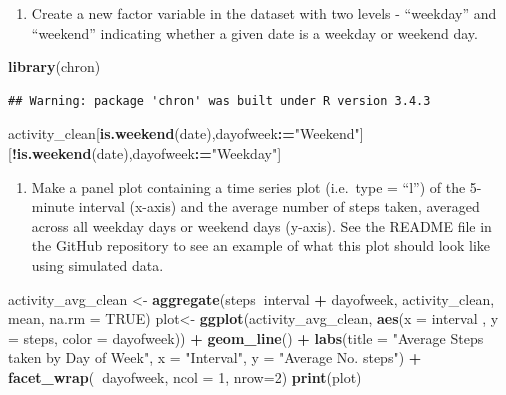 \documentclass[]{article}
\newenvironment{Shaded}{\begin{snugshade}}{\end{snugshade}}
\newcommand{\KeywordTok}[1]{\textcolor[rgb]{0.13,0.29,0.53}{\textbf{#1}}}
\newcommand{\DataTypeTok}[1]{\textcolor[rgb]{0.13,0.29,0.53}{#1}}
\newcommand{\DecValTok}[1]{\textcolor[rgb]{0.00,0.00,0.81}{#1}}
\newcommand{\StringTok}[1]{\textcolor[rgb]{0.31,0.60,0.02}{#1}}
\newcommand{\OtherTok}[1]{\textcolor[rgb]{0.56,0.35,0.01}{#1}}
\newcommand{\OperatorTok}[1]{\textcolor[rgb]{0.81,0.36,0.00}{\textbf{#1}}}
\newcommand{\ErrorTok}[1]{\textcolor[rgb]{0.64,0.00,0.00}{\textbf{#1}}}
\newcommand{\NormalTok}[1]{#1}
\providecommand{\tightlist}{%
  \setlength{\itemsep}{0pt}\setlength{\parskip}{0pt}}
\begin{document}
\begin{enumerate}
\def\labelenumi{\arabic{enumi}.}
\tightlist
\item
  Create a new factor variable in the dataset with two levels -
  ``weekday'' and ``weekend'' indicating whether a given date is a
  weekday or weekend day.
\end{enumerate}

\begin{Shaded}
\begin{Highlighting}[]
\KeywordTok{library}\NormalTok{(chron)}
\end{Highlighting}
\end{Shaded}

\begin{verbatim}
## Warning: package 'chron' was built under R version 3.4.3
\end{verbatim}

\begin{Shaded}
\begin{Highlighting}[]
\NormalTok{activity_clean[}\KeywordTok{is.weekend}\NormalTok{(date),dayofweek}\OperatorTok{:}\ErrorTok{=}\StringTok{"Weekend"}\NormalTok{][}\OperatorTok{!}\KeywordTok{is.weekend}\NormalTok{(date),dayofweek}\OperatorTok{:}\ErrorTok{=}\StringTok{"Weekday"}\NormalTok{]}
\end{Highlighting}
\end{Shaded}

\begin{enumerate}
\def\labelenumi{\arabic{enumi}.}
\setcounter{enumi}{1}
\tightlist
\item
  Make a panel plot containing a time series plot (i.e.~type = ``l'') of
  the 5-minute interval (x-axis) and the average number of steps taken,
  averaged across all weekday days or weekend days (y-axis). See the
  README file in the GitHub repository to see an example of what this
  plot should look like using simulated data.
\end{enumerate}

\begin{Shaded}
\begin{Highlighting}[]
\NormalTok{activity_avg_clean <-}\StringTok{ }\KeywordTok{aggregate}\NormalTok{(steps}\OperatorTok{~}\NormalTok{interval }\OperatorTok{+}\StringTok{ }\NormalTok{dayofweek, activity_clean, mean, }\DataTypeTok{na.rm =} \OtherTok{TRUE}\NormalTok{)}
\NormalTok{plot<-}\StringTok{ }\KeywordTok{ggplot}\NormalTok{(activity_avg_clean, }\KeywordTok{aes}\NormalTok{(}\DataTypeTok{x =}\NormalTok{ interval , }\DataTypeTok{y =}\NormalTok{ steps, }\DataTypeTok{color =}\NormalTok{ dayofweek)) }\OperatorTok{+}
\StringTok{       }\KeywordTok{geom_line}\NormalTok{() }\OperatorTok{+}
\StringTok{       }\KeywordTok{labs}\NormalTok{(}\DataTypeTok{title =} \StringTok{"Average Steps taken by Day of Week"}\NormalTok{, }\DataTypeTok{x =} \StringTok{"Interval"}\NormalTok{, }\DataTypeTok{y =} \StringTok{"Average No. steps"}\NormalTok{) }\OperatorTok{+}
\StringTok{       }\KeywordTok{facet_wrap}\NormalTok{(}\OperatorTok{~}\NormalTok{dayofweek, }\DataTypeTok{ncol =} \DecValTok{1}\NormalTok{, }\DataTypeTok{nrow=}\DecValTok{2}\NormalTok{)}
\KeywordTok{print}\NormalTok{(plot)}
\end{Highlighting}
\end{Shaded}
\end{document}
